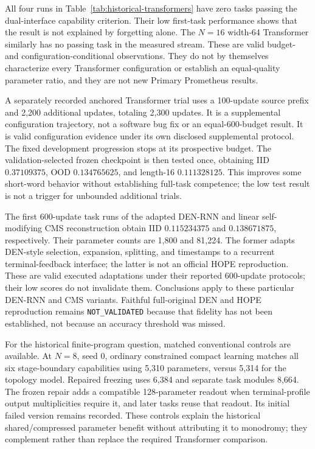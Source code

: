 All four runs in Table~\ref{tab:historical-transformers} have zero tasks passing
the dual-interface capability criterion. Their low first-task performance
shows that the result is not explained by forgetting alone. The $N=16$
width-64 Transformer similarly has no passing task in the measured stream.
These are valid budget- and configuration-conditional observations. They do
not by themselves characterize every Transformer configuration or establish an
equal-quality parameter ratio, and they are not new Primary Prometheus results.

A separately recorded anchored Transformer trial uses a 100-update source
prefix and 2,200 additional updates, totaling 2,300 updates. It is a supplemental
configuration trajectory, not a software bug fix or an equal-600-budget result.
It is valid configuration evidence under its own disclosed supplemental protocol.
The fixed development progression stops at its prospective budget. The
validation-selected frozen checkpoint is then tested once, obtaining IID
$0.37109375$, OOD $0.134765625$, and length-16 $0.111328125$. This improves
some short-word behavior without establishing full-task competence; the low
test result is not a trigger for unbounded additional trials.

The first 600-update task runs of the adapted DEN-RNN and linear
self-modifying CMS reconstruction obtain IID $0.115234375$ and
$0.138671875$, respectively. Their parameter counts are 1,800 and 81,224.
The former adapts DEN-style selection, expansion, splitting, and timestamps to
a recurrent terminal-feedback interface; the latter is not an official HOPE
reproduction. These are valid executed adaptations under their reported
600-update protocols; their low scores do not invalidate them. Conclusions
apply to these particular DEN-RNN and CMS variants. Faithful full-original
DEN and HOPE reproduction remains \texttt{NOT\_VALIDATED} because that fidelity
has not been established, not because an accuracy threshold was missed.

For the historical finite-program question, matched conventional controls are available.
At $N=8$, seed 0, ordinary constrained compact learning matches all six
stage-boundary capabilities using 5,310 parameters, versus 5,314 for the
topology model. Repaired freezing uses 6,384 and separate task modules 8,664.
The frozen repair adds a compatible 128-parameter readout when terminal-profile
output multiplicities require it, and later tasks reuse that readout. Its
initial failed version remains recorded. These controls explain the historical
shared/compressed parameter benefit without attributing it to monodromy; they
complement rather than replace the required Transformer comparison.

